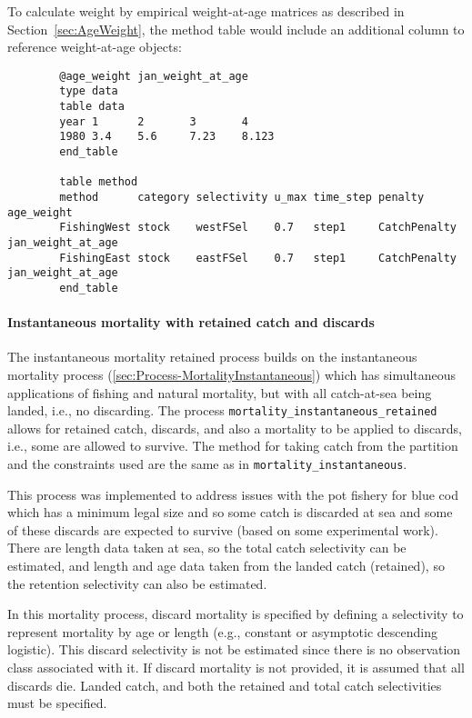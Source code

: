 To calculate weight by empirical weight-at-age matrices as described in Section~\ref{sec:AgeWeight}, the method table would include an additional column to reference weight-at-age objects:

{\small{\begin{verbatim}
		@age_weight jan_weight_at_age
		type data
		table data
		year 1 		2 		3 		4
		1980 3.4	5.6		7.23 	8.123
		end_table

		table method
		method      category selectivity u_max time_step penalty      age_weight
		FishingWest stock    westFSel    0.7   step1     CatchPenalty jan_weight_at_age
		FishingEast stock    eastFSel    0.7   step1     CatchPenalty jan_weight_at_age
		end_table
\end{verbatim}}}


\paragraph{Instantaneous mortality with retained catch and discards}\label{sec:Process-MortalityInstantaneousRetained}

The instantaneous mortality retained process builds on the instantaneous mortality process (\ref{sec:Process-MortalityInstantaneous}) which has simultaneous applications of fishing and natural mortality, but with all catch-at-sea being landed, i.e., no discarding. The process \texttt{mortality\_instantaneous\_retained} allows for retained catch, discards, and also a mortality to be applied to discards, i.e., some are allowed to survive. The method for taking catch from the partition and the constraints used are the same as in \texttt{mortality\_instantaneous}.

This process was implemented to address issues with the pot fishery for blue cod which has a minimum legal size and so some catch is discarded at sea and some of these discards are expected to survive (based on some experimental work). There are length data taken at sea, so the total catch selectivity can be estimated, and length and age data taken from the landed catch (retained), so the retention selectivity can also be estimated.

In this mortality process, discard mortality is specified by defining a selectivity to represent mortality by age or length (e.g., constant or asymptotic descending logistic).  This discard selectivity is not be estimated since there is no observation class associated with it. If discard mortality is not provided, it is assumed that all discards die. Landed catch, and both the retained and total catch selectivities must be specified.

